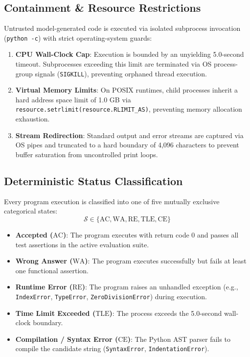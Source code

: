 \documentclass[letterpaper]{article} %
\begin{document}
\subsection{Containment \& Resource Restrictions}
Untrusted model-generated code is executed via isolated subprocess invocation (\texttt{python -c}) with strict operating-system guards:
\begin{enumerate}
    \item \textbf{CPU Wall-Clock Cap}: Execution is bounded by an unyielding 5.0-second timeout. Subprocesses exceeding this limit are terminated via OS process-group signals (\texttt{SIGKILL}), preventing orphaned thread execution.
    \item \textbf{Virtual Memory Limits}: On POSIX runtimes, child processes inherit a hard address space limit of 1.0 GB via \texttt{resource.setrlimit(resource.RLIMIT\_AS)}, preventing memory allocation exhaustion.
    \item \textbf{Stream Redirection}: Standard output and error streams are captured via OS pipes and truncated to a hard boundary of 4,096 characters to prevent buffer saturation from uncontrolled print loops.
\end{enumerate}

\subsection{Deterministic Status Classification}
Every program execution is classified into one of five mutually exclusive categorical states:
$$\mathcal{S} \in \{\text{AC}, \text{WA}, \text{RE}, \text{TLE}, \text{CE}\}$$
\begin{itemize}
    \item \textbf{Accepted ($\text{AC}$)}: The program executes with return code 0 and passes all test assertions in the active evaluation suite.
    \item \textbf{Wrong Answer ($\text{WA}$)}: The program executes successfully but fails at least one functional assertion.
    \item \textbf{Runtime Error ($\text{RE}$)}: The program raises an unhandled exception (e.g., \texttt{IndexError}, \texttt{TypeError}, \texttt{ZeroDivisionError}) during execution.
    \item \textbf{Time Limit Exceeded ($\text{TLE}$)}: The process exceeds the 5.0-second wall-clock boundary.
    \item \textbf{Compilation / Syntax Error ($\text{CE}$)}: The Python AST parser fails to compile the candidate string (\texttt{SyntaxError}, \texttt{IndentationError}).
\end{itemize}
\end{document}
